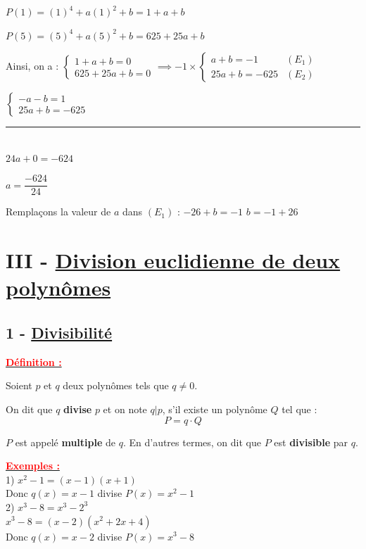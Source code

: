 \documentclass[12pt,a4paper]{article}
\begin{document}
$P(1) = (1)^4 + a(1)^2 + b = 1 + a + b$

$P(5) = (5)^4 + a(5)^2 + b = 625 + 25a + b$

Ainsi, on a :
$\begin{cases} 1 + a + b = 0 \\ 625 + 25a + b = 0 \end{cases} \implies -1 \times \begin{cases} a + b = -1 & (E_1) \\ 25a + b = -625 & (E_2) \end{cases}$

$\begin{cases} -a - b = 1 \\ 25a + b = -625 \end{cases}$

\rule{2cm}{0.4pt} \\
$24a + 0 = -624$

$a = \dfrac{-624}{24}$


Remplaçons la valeur de $a$ dans $(E_1)$ :
$-26 + b = -1$
$b = -1 + 26$


\section*{%
    \color{red}III - \underline{ Division euclidienne de deux polynômes}%
}


\subsection*{%
    \color{red}1 - \underline{ Divisibilité}%
}

\textbf{\underline{\textcolor{red}{Définition :}}}  

Soient $p$ et $q$ deux polynômes tels que $q \neq 0$.

\vspace{1em}

\noindent On dit que $q$ \textbf{\color{red} divise} $p$ et on note $q | p$, s'il existe un polynôme $Q$ tel que :
$$P = q \cdot Q$$

\noindent $P$ est appelé \textbf{\color{red} multiple} de $q$. En d'autres termes, on dit que $P$ est \textbf{\color{red} divisible} par $q$.

\textbf{\underline{\textcolor{red}{Exemples :}}} \\
1) $x^2 - 1 = (x - 1)(x + 1)$ \\
Donc $q(x) = x - 1$ divise $P(x) = x^2 - 1$ \\
2) $x^3 - 8 = x^3 - 2^3$ \\
$x^3 - 8 = (x - 2)(x^2 + 2x + 4)$ \\
Donc $q(x) = x - 2$ divise $P(x) = x^3 - 8$
\end{document}
